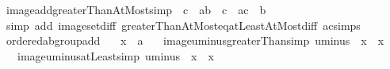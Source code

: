 \begin{isabellebody}
\endisatagproof
{\isafoldproof}%
%
\isadelimproof
\isanewline
%
\endisadelimproof
\isanewline
{}\isamarkupfalse%
\ image{\isacharunderscore}{\kern0pt}add{\isacharunderscore}{\kern0pt}greaterThanAtMost{\isacharbrackleft}{\kern0pt}simp{\isacharbrackright}{\kern0pt}{\isacharcolon}{\kern0pt}\ {\isachardoublequoteopen}{\isacharparenleft}{\kern0pt}{\isacharplus}{\kern0pt}{\isacharparenright}{\kern0pt}\ c\ {\isacharbackquote}{\kern0pt}\ {\isacharbraceleft}{\kern0pt}a{\isacharless}{\kern0pt}{\isachardot}{\kern0pt}{\isachardot}{\kern0pt}b{\isacharbraceright}{\kern0pt}\ {\isacharequal}{\kern0pt}\ {\isacharbraceleft}{\kern0pt}c\ {\isacharplus}{\kern0pt}\ a{\isacharless}{\kern0pt}{\isachardot}{\kern0pt}{\isachardot}{\kern0pt}c\ {\isacharplus}{\kern0pt}\ b{\isacharbraceright}{\kern0pt}{\isachardoublequoteclose}\isanewline
%
\isadelimproof
\ \ %
\endisadelimproof
%
\isatagproof
{}\isamarkupfalse%
\ {\isacharparenleft}{\kern0pt}simp\ add{\isacharcolon}{\kern0pt}\ image{\isacharunderscore}{\kern0pt}set{\isacharunderscore}{\kern0pt}diff\ greaterThanAtMost{\isacharunderscore}{\kern0pt}eq{\isacharunderscore}{\kern0pt}atLeastAtMost{\isacharunderscore}{\kern0pt}diff\ ac{\isacharunderscore}{\kern0pt}simps{\isacharparenright}{\kern0pt}%
\endisatagproof
{\isafoldproof}%
%
\isadelimproof
\isanewline
%
\endisadelimproof
\isanewline
{}\isamarkupfalse%
\isanewline
\isanewline
{}\isamarkupfalse%
\ ordered{\isacharunderscore}{\kern0pt}ab{\isacharunderscore}{\kern0pt}group{\isacharunderscore}{\kern0pt}add\isanewline
{}\isanewline
\isanewline
{}\isamarkupfalse%
\isanewline
\ \ \ x\ {\isacharcolon}{\kern0pt}{\isacharcolon}{\kern0pt}\ {\isacharprime}{\kern0pt}a\isanewline
\ \ \ image{\isacharunderscore}{\kern0pt}uminus{\isacharunderscore}{\kern0pt}greaterThan{\isacharbrackleft}{\kern0pt}simp{\isacharbrackright}{\kern0pt}{\isacharcolon}{\kern0pt}\ {\isachardoublequoteopen}uminus\ {\isacharbackquote}{\kern0pt}\ {\isacharbraceleft}{\kern0pt}x{\isacharless}{\kern0pt}{\isachardot}{\kern0pt}{\isachardot}{\kern0pt}{\isacharbraceright}{\kern0pt}\ {\isacharequal}{\kern0pt}\ {\isacharbraceleft}{\kern0pt}{\isachardot}{\kern0pt}{\isachardot}{\kern0pt}{\isacharless}{\kern0pt}{\isacharminus}{\kern0pt}x{\isacharbraceright}{\kern0pt}{\isachardoublequoteclose}\isanewline
\ \ \ image{\isacharunderscore}{\kern0pt}uminus{\isacharunderscore}{\kern0pt}atLeast{\isacharbrackleft}{\kern0pt}simp{\isacharbrackright}{\kern0pt}{\isacharcolon}{\kern0pt}\ {\isachardoublequoteopen}uminus\ {\isacharbackquote}{\kern0pt}\ {\isacharbraceleft}{\kern0pt}x{\isachardot}{\kern0pt}{\isachardot}{\kern0pt}{\isacharbraceright}{\kern0pt}\ {\isacharequal}{\kern0pt}\ {\isacharbraceleft}{\kern0pt}{\isachardot}{\kern0pt}{\isachardot}{\kern0pt}{\isacharminus}{\kern0pt}x{\isacharbraceright}{\kern0pt}{\isachardoublequoteclose}\isanewline

\end{isabellebody}
